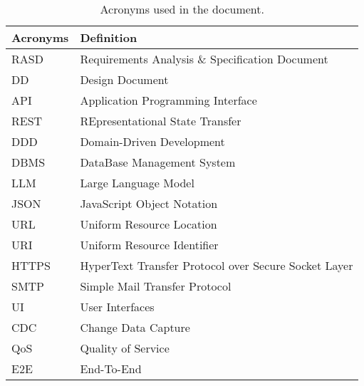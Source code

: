 \begin{table}[H]
    \begin{center}
        \begin{tabular}{ |l|l| }
            \hline
            \textbf{Acronyms} & \textbf{Definition}                              \\
            \hline
            RASD           & Requirements Analysis \& Specification Document   \\
            \hline
            DD             & Design Document   \\
            \hline
            API            & Application Programming Interface                  \\
            \hline
            REST           & REpresentational State Transfer   \\
            \hline
            DDD            & Domain-Driven Development   \\
            \hline
            DBMS           & DataBase Management System   \\
            \hline
            LLM            & Large Language Model  \\
            \hline 
            JSON           & JavaScript Object Notation  \\
            \hline
            URL            & Uniform Resource Location  \\
            \hline
            URI            & Uniform Resource Identifier  \\
            \hline
            HTTPS          & HyperText Transfer Protocol over Secure Socket Layer   \\
            \hline
            SMTP           & Simple Mail Transfer Protocol  \\
            \hline
            UI             & User Interfaces \\
            \hline
            CDC            & Change Data Capture \\
            \hline
            QoS             & Quality of Service \\
            \hline            
            E2E            & End-To-End \\
            \hline
         \end{tabular}
        \caption{Acronyms used in the document.}
        \label{tab:acronyms}%
    \end{center}
\end{table}


